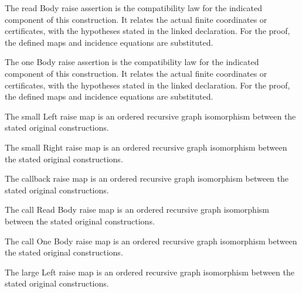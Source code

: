 The read Body raise assertion is the compatibility law for the indicated component of this construction. It relates the actual finite coordinates or certificates, with the hypotheses stated in the linked declaration.
For the proof, the defined maps and incidence equations are substituted.
\par{}

The one Body raise assertion is the compatibility law for the indicated component of this construction. It relates the actual finite coordinates or certificates, with the hypotheses stated in the linked declaration.
For the proof, the defined maps and incidence equations are substituted.
\par{}

The small Left raise map is an ordered recursive graph isomorphism between the stated original constructions.
\par{}

The small Right raise map is an ordered recursive graph isomorphism between the stated original constructions.
\par{}

The callback raise map is an ordered recursive graph isomorphism between the stated original constructions.
\par{}

The call Read Body raise map is an ordered recursive graph isomorphism between the stated original constructions.
\par{}

The call One Body raise map is an ordered recursive graph isomorphism between the stated original constructions.
\par{}

The large Left raise map is an ordered recursive graph isomorphism between the stated original constructions.
\par{}

